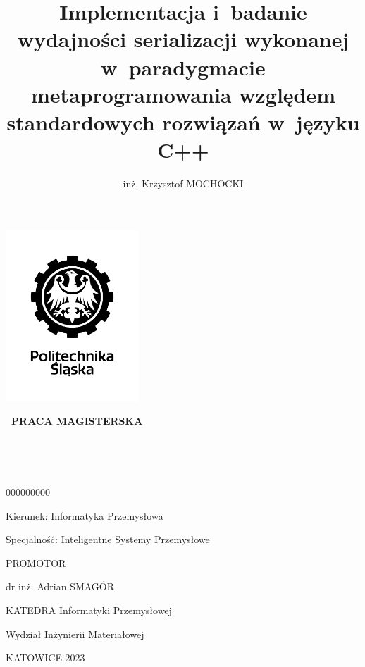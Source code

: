\documentclass[12pt]{article}
\title{Implementacja i~badanie wydajności serializacji wykonanej w~paradygmacie metaprogramowania względem standardowych rozwiązań w~języku C++}
\author{inż. Krzysztof MOCHOCKI}
\date{}
\begin{document}
	\renewcommand*\listfigurename{}
	\renewcommand*\listoftables{}

	\begin{titlepage}
		\clearpage
		\centering

		\includegraphics[width=5cm, keepaspectratio=true]{./img/black_and_white_polsl_logo.png}

		{\LARGE\bfseries\ PRACA MAGISTERSKA}

		\vspace*{1cm}

		{\LARGE \MyTitle}

		\Large\bfseries\

		\begin{spacing}{1.125}
			\MyAuthor\

			000000000
			\vspace*{1cm}

			Kierunek: Informatyka Przemysłowa

			Specjalność: Inteligentne Systemy Przemysłowe

			\vspace*{1cm}

			PROMOTOR

			dr inż. Adrian SMAGÓR

			\vspace*{0.5cm}

			KATEDRA Informatyki Przemysłowej

			Wydział Inżynierii Materiałowej

			\vspace*{\vfill}

			KATOWICE 2023
		\end{spacing}

		\thispagestyle{empty}
	\end{titlepage}
\end{document}
